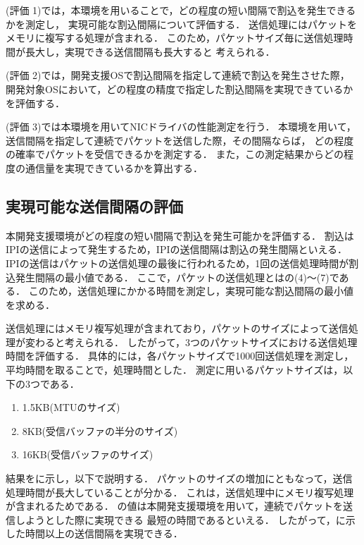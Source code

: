 \documentclass[submit,techreq,noauthor,dvipdfmx]{ipsj}
\begin{document}
(評価 1)では，本環境を用いることで，どの程度の短い間隔で割込を発生できるかを測定し，
実現可能な割込間隔について評価する．
送信処理にはパケットをメモリに複写する処理が含まれる．
このため，パケットサイズ毎に送信処理時間が長大し，実現できる送信間隔も長大すると
考えられる．

(評価 2)では，開発支援OSで割込間隔を指定して連続で割込を発生させた際，
開発対象OSにおいて，どの程度の精度で指定した割込間隔を実現できているかを評価する．

(評価 3)では本環境を用いてNICドライバの性能測定を行う．
本環境を用いて，送信間隔を指定して連続でパケットを送信した際，その間隔ならば，
どの程度の確率でパケットを受信できるかを測定する．
また，この測定結果からどの程度の通信量を実現できているかを算出する．

\subsection{実現可能な送信間隔の評価}\label{sec:interval}

本開発支援環境がどの程度の短い間隔で割込を発生可能かを評価する．
割込はIPIの送信によって発生するため，IPIの送信間隔は割込の発生間隔といえる．
IPIの送信はパケットの送信処理の最後に行われるため，1回の送信処理時間が割込発生間隔の最小値である．
ここで，パケットの送信処理とはの(4)〜(7)である．
このため，送信処理にかかる時間を測定し，実現可能な割込間隔の最小値を求める．

送信処理にはメモリ複写処理が含まれており，パケットのサイズによって送信処理が変わると考えられる．
したがって，3つのパケットサイズにおける送信処理時間を評価する．
具体的には，各パケットサイズで1000回送信処理を測定し，
平均時間を取ることで，処理時間とした．
測定に用いるパケットサイズは，以下の3つである．
\begin{enumerate}
    \item 1.5KB(MTUのサイズ)
    \item 8KB(受信バッファの半分のサイズ)
    \item 16KB(受信バッファのサイズ)
\end{enumerate}

結果をに示し，以下で説明する．
パケットのサイズの増加にともなって，送信処理時間が長大していることが分かる．
これは，送信処理中にメモリ複写処理が含まれるためである．
の値は本開発支援環境を用いて，連続でパケットを送信しようとした際に実現できる
最短の時間であるといえる．
したがって，に示した時間以上の送信間隔を実現できる．
\end{document}
